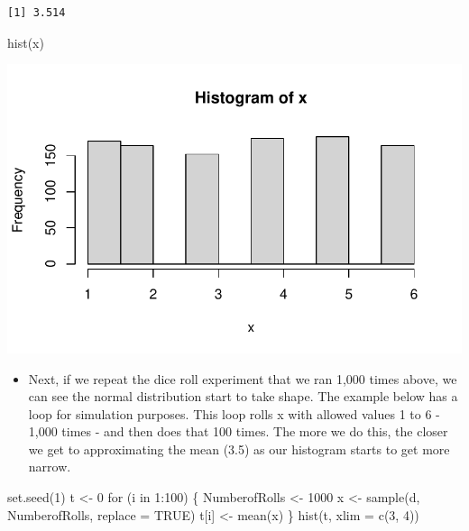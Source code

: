 \documentclass[
  letterpaper,
  DIV=11,
  numbers=noendperiod]{scrreprt}
\newenvironment{Shaded}{\begin{snugshade}}{\end{snugshade}}
\newcommand{\AttributeTok}[1]{\textcolor[rgb]{0.40,0.45,0.13}{#1}}
\newcommand{\ConstantTok}[1]{\textcolor[rgb]{0.56,0.35,0.01}{#1}}
\newcommand{\ControlFlowTok}[1]{\textcolor[rgb]{0.00,0.23,0.31}{#1}}
\newcommand{\DecValTok}[1]{\textcolor[rgb]{0.68,0.00,0.00}{#1}}
\newcommand{\FunctionTok}[1]{\textcolor[rgb]{0.28,0.35,0.67}{#1}}
\newcommand{\NormalTok}[1]{\textcolor[rgb]{0.00,0.23,0.31}{#1}}
\newcommand{\OtherTok}[1]{\textcolor[rgb]{0.00,0.23,0.31}{#1}}
\newcommand{\SpecialCharTok}[1]{\textcolor[rgb]{0.37,0.37,0.37}{#1}}
\providecommand{\tightlist}{%
  \setlength{\itemsep}{0pt}\setlength{\parskip}{0pt}}\usepackage{longtable,booktabs,array}
\begin{document}
\begin{verbatim}
[1] 3.514
\end{verbatim}

\begin{Shaded}
\begin{Highlighting}[]
\FunctionTok{hist}\NormalTok{(x)}
\end{Highlighting}
\end{Shaded}

\includegraphics{probability_files/figure-pdf/unnamed-chunk-45-1.pdf}

\begin{itemize}
\tightlist
\item
  Next, if we repeat the dice roll experiment that we ran 1,000 times
  above, we can see the normal distribution start to take shape. The
  example below has a loop for simulation purposes. This loop rolls x
  with allowed values 1 to 6 - 1,000 times - and then does that 100
  times. The more we do this, the closer we get to approximating the
  mean (3.5) as our histogram starts to get more narrow.
\end{itemize}

\begin{Shaded}
\begin{Highlighting}[]
\FunctionTok{set.seed}\NormalTok{(}\DecValTok{1}\NormalTok{)}
\NormalTok{t }\OtherTok{\textless{}{-}} \DecValTok{0}
\ControlFlowTok{for}\NormalTok{ (i }\ControlFlowTok{in} \DecValTok{1}\SpecialCharTok{:}\DecValTok{100}\NormalTok{) \{}
\NormalTok{    NumberofRolls }\OtherTok{\textless{}{-}} \DecValTok{1000}
\NormalTok{    x }\OtherTok{\textless{}{-}} \FunctionTok{sample}\NormalTok{(d, NumberofRolls, }\AttributeTok{replace =} \ConstantTok{TRUE}\NormalTok{)}
\NormalTok{    t[i] }\OtherTok{\textless{}{-}} \FunctionTok{mean}\NormalTok{(x)}
\NormalTok{\}}
\FunctionTok{hist}\NormalTok{(t, }\AttributeTok{xlim =} \FunctionTok{c}\NormalTok{(}\DecValTok{3}\NormalTok{, }\DecValTok{4}\NormalTok{))}
\end{Highlighting}
\end{Shaded}
\end{document}
